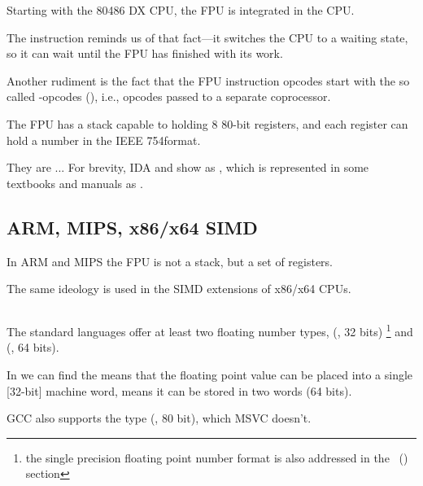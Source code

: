 Starting with the 80486 DX CPU, the \ac{FPU} is integrated in the \ac{CPU}.

The  instruction reminds us of that fact---it switches the \ac{CPU} to a waiting state, so it can wait until the \ac{FPU} has finished with its work.

Another rudiment is the fact that the \ac{FPU} instruction 
opcodes start with the so called -opcodes (), i.e., 
opcodes passed to a separate coprocessor.

\label{FPU_is_stack}

The FPU has a stack capable to holding 8 80-bit registers, and each register can hold a number 
in the IEEE 754\FNURLIEEE format.

They are ... For brevity, IDA and \olly show  as , 
which is represented in some textbooks and manuals as .

\subsection{ARM, MIPS, x86/x64 SIMD}

In ARM and MIPS the FPU is not a stack, but a set of registers.

The same ideology is used in the SIMD extensions of x86/x64 CPUs.

\subsection{\CCpp}


The standard \CCpp languages offer at least two floating number types, \Tfloat (\FNURLSP, 32 bits)
\footnote{the single precision floating point number format is also addressed in 
the \IT{\WorkingWithFloatAsWithStructSubSubSectionName}~() section}
and \Tdouble (\FNURLDP, 64 bits).

In  we can find the  means that the floating point value can be placed into a single
[32-bit] machine word,  means it can be stored in two words (64 bits).


GCC also supports the  type (\FNURLEP, 80 bit), which MSVC doesn't.

